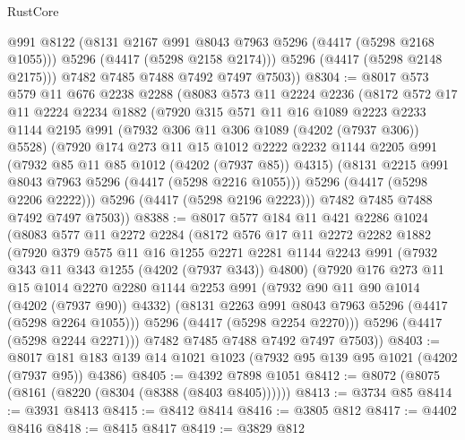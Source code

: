 \begin{lexlean}{RustCore}
\begin{coremodule}
            @991
            @8122
            (@8131 @2167 @991 @8043 @7963 @5296 (@4417 (@5298 @2168 @1055)))
            @5296
            (@4417 (@5298 @2158 @2174)))
          @5296
          (@4417 (@5298 @2148 @2175)))
        @7482
        @7485
        @7488
        @7492
        @7497
        @7503))
@8304 := @8017
    @573
    @579
    @11
    @676
    @2238
    @2288
    (@8083
      @573
      @11
      @2224
      @2236
      (@8172
        @572
        @17
        @11
        @2224
        @2234
        @1882
        (@7920
          @315
          @571
          @11
          @16
          @1089
          @2223
          @2233
          @1144
          @2195
          @991
          (@7932 @306 @11 @306 @1089 (@4202 (@7937 @306)) @5528)
          (@7920
            @174
            @273
            @11
            @15
            @1012
            @2222
            @2232
            @1144
            @2205
            @991
            (@7932 @85 @11 @85 @1012 (@4202 (@7937 @85)) @4315)
            (@8131 @2215 @991 @8043 @7963 @5296 (@4417 (@5298 @2216 @1055)))
            @5296
            (@4417 (@5298 @2206 @2222)))
          @5296
          (@4417 (@5298 @2196 @2223)))
        @7482
        @7485
        @7488
        @7492
        @7497
        @7503))
@8388 := @8017
    @577
    @184
    @11
    @421
    @2286
    @1024
    (@8083
      @577
      @11
      @2272
      @2284
      (@8172
        @576
        @17
        @11
        @2272
        @2282
        @1882
        (@7920
          @379
          @575
          @11
          @16
          @1255
          @2271
          @2281
          @1144
          @2243
          @991
          (@7932 @343 @11 @343 @1255 (@4202 (@7937 @343)) @4800)
          (@7920
            @176
            @273
            @11
            @15
            @1014
            @2270
            @2280
            @1144
            @2253
            @991
            (@7932 @90 @11 @90 @1014 (@4202 (@7937 @90)) @4332)
            (@8131 @2263 @991 @8043 @7963 @5296 (@4417 (@5298 @2264 @1055)))
            @5296
            (@4417 (@5298 @2254 @2270)))
          @5296
          (@4417 (@5298 @2244 @2271)))
        @7482
        @7485
        @7488
        @7492
        @7497
        @7503))
@8403 := @8017 @181 @183 @139 @14 @1021 @1023 (@7932 @95 @139 @95 @1021 (@4202 (@7937 @95)) @4386)
@8405 := @4392 @7898 @1051
@8412 := @8072 (@8075 (@8161 (@8220 (@8304 (@8388 (@8403 @8405))))))
@8413 := @3734 @85
@8414 := @3931 @8413
@8415 := @8412 @8414
@8416 := @3805 @812
@8417 := @4402 @8416
@8418 := @8415 @8417
@8419 := @3829 @812

\end{coremodule}
\end{lexlean}
